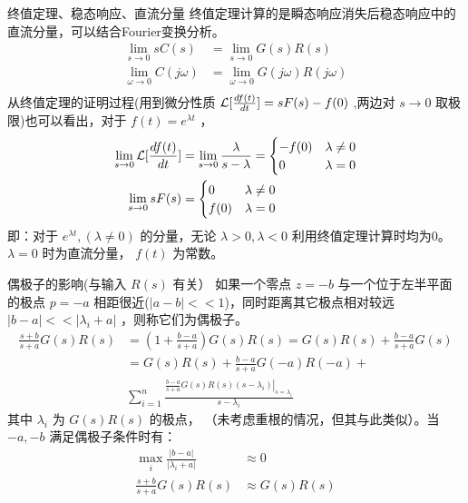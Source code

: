 \documentclass[presentation]{beamer}
\begin{document}
\begin{frame}[label={sec:org32ed60c}]{终值定理、稳态响应、直流分量}
终值定理计算的是瞬态响应消失后稳态响应中的直流分量，可以结合Fourier变换分析。
\begin{align*}
\lim_{s\to 0}sC(s) &= \lim_{s\to 0}G(s)R(s) \\
\lim_{\omega\to 0}C(j\omega) &= \lim_{\omega\to 0}G(j\omega)R(j\omega)\\
\end{align*}
从终值定理的证明过程(用到微分性质 \({\cal L}[\frac{df(t)}{dt}]=sF(s)-f(0)\) ,两边对 \(s\to 0\) 取极限)也可以看出，对于 \(f(t)=e^{\lambda t}\) ，
\begin{align*}
\lim_{s\to 0}{\cal L} [\frac{df(t)}{dt}]&=\lim_{s\to 0}\frac{\lambda}{s-\lambda}=
\begin{cases}
-f(0)  & \lambda\neq 0\\
0   & \lambda=0
\end{cases}\\
\lim_{s\to 0} sF(s) &=
\begin{cases}
0  & \lambda\neq 0\\
f(0)   & \lambda=0
\end{cases}
\end{align*}
即：对于 \(e^{\lambda t},(\lambda\neq0)\) 的分量，无论 \(\lambda>0,\lambda<0\) 利用终值定理计算时均为0。\(\lambda=0\) 时为直流分量， \(f(t)\) 为常数。
\end{frame}
\begin{frame}[label={sec:orgabf0f8e}]{偶极子的影响(与输入 \(R(s)\) 有关）}
如果一个零点 \(z=-b\) 与一个位于左半平面的极点 \(p=-a\) 相距很近(\(|a-b|<<1\))，同时距离其它极点相对较远 \(|b-a|<<|\lambda_i+a|\) ，则称它们为偶极子。
\begin{align*}
\frac{s+b}{s+a}G(s)R(s) & = (1+\frac{b-a}{s+a})G(s)R(s)=G(s)R(s)+\frac{b-a}{s+a}G(s)\\
&=G(s)R(s)+\frac{b-a}{s+a}G(-a)R(-a)+\\
& \sum_{i=1}^n \frac{\left.\frac{b-a}{s+a}G(s)R(s)(s-\lambda_i)\right|_{s=\lambda_i}}{s-\lambda_i}
\end{align*}
其中 \(\lambda_i\) 为 \(G(s)R(s)\) 的极点， （未考虑重根的情况，但其与此类似）。当 \(-a,-b\) 满足偶极子条件时有：
\begin{align*}
\max_{i}\frac{|b-a|}{|\lambda_i+a|} &\approx 0\\
\frac{s+b}{s+a}G(s)R(s) & \approx G(s)R(s) 
\end{align*}
\end{frame}
\end{document}
